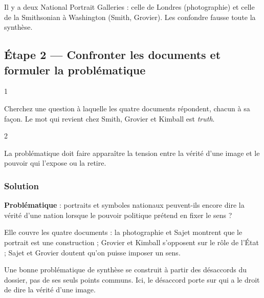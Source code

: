 \documentclass[11pt,a4paper]{article}
\begin{document}
\begin{piege}

Il y a deux National Portrait Galleries : celle de Londres (photographie) et celle de la Smithsonian à Washington (Smith, Grovier). Les confondre fausse toute la synthèse.

\end{piege}

\hypertarget{uxe9tape-2-confronter-les-documents-et-formuler-la-probluxe9matique}{%
\subsection{Étape 2 --- Confronter les documents et formuler la problématique}\label{uxe9tape-2-confronter-les-documents-et-formuler-la-probluxe9matique}}

\begin{indication}{1}

Cherchez une question à laquelle les quatre documents répondent, chacun à sa façon. Le mot qui revient chez Smith, Grovier et Kimball est \emph{truth}.

\end{indication}

\begin{indication}{2}

La problématique doit faire apparaître la tension entre la vérité d'une image et le pouvoir qui l'expose ou la retire.

\end{indication}

\hypertarget{solution-1}{%
\subsubsection{Solution}\label{solution-1}}

\textbf{Problématique} : portraits et symboles nationaux peuvent-ils encore dire la vérité d'une nation lorsque le pouvoir politique prétend en fixer le sens ?

Elle couvre les quatre documents : la photographie et Sajet montrent que le portrait est une construction ; Grovier et Kimball s'opposent sur le rôle de l'État ; Sajet et Grovier doutent qu'on puisse imposer un sens.

\begin{methode}

Une bonne problématique de synthèse se construit à partir des désaccords du dossier, pas de ses seuls points communs. Ici, le désaccord porte sur qui a le droit de dire la vérité d'une image.

\end{methode}
\end{document}
